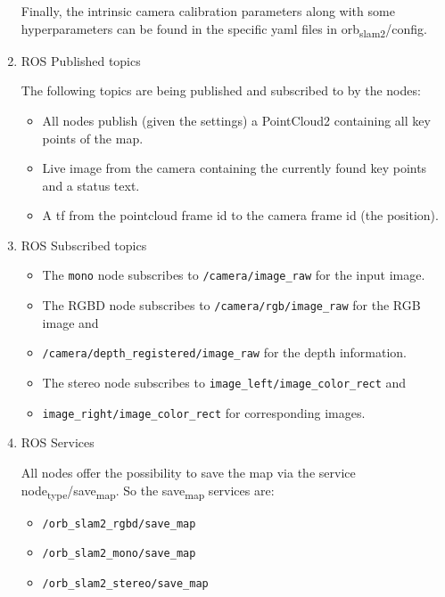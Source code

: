 \documentclass[unrestricted]{meetingnotesminutes}
\begin{document}
\begin{enumerate}
Finally, the intrinsic camera calibration parameters along with some hyperparameters can be found in the specific yaml files in orb\textsubscript{slam2}/config.

\item ROS Published topics
\label{sec:orgd81a8f4}

The following topics are being published and subscribed to by the nodes:

\begin{itemize}
\item All nodes publish (given the settings) a PointCloud2 containing all key points of the map.
\item Live image from the camera containing the currently found key points and a status text.
\item A tf from the pointcloud frame id to the camera frame id (the position).
\end{itemize}

\item ROS Subscribed topics
\label{sec:orgd6ecd7b}

\begin{itemize}
\item The \texttt{mono} node subscribes to \texttt{/camera/image\_raw} for the input image.
\item The RGBD node subscribes to \texttt{/camera/rgb/image\_raw} for the RGB image and
\item \texttt{/camera/depth\_registered/image\_raw} for the depth information.
\item The stereo node subscribes to \texttt{image\_left/image\_color\_rect} and
\item \texttt{image\_right/image\_color\_rect} for corresponding images.
\end{itemize}

\item ROS Services
\label{sec:orgcba39ce}

All nodes offer the possibility to save the map via the service node\textsubscript{type}/save\textsubscript{map}. So the save\textsubscript{map} services are:

\begin{itemize}
\item \texttt{/orb\_slam2\_rgbd/save\_map}
\item \texttt{/orb\_slam2\_mono/save\_map}
\item \texttt{/orb\_slam2\_stereo/save\_map}
\end{itemize}
\end{enumerate}
\end{document}
